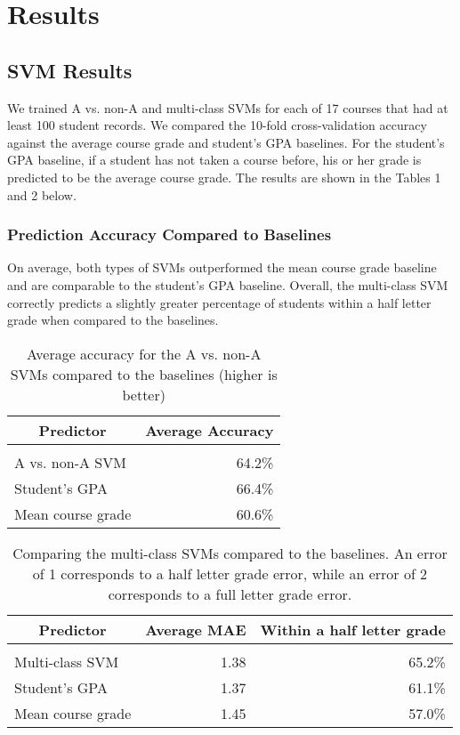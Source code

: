 
\section{Results}

\subsection{SVM Results}

We trained A vs. non-A and multi-class SVMs for each of 17 courses that had at least 100 student records. We compared the 10-fold cross-validation accuracy against the average course grade and student's GPA baselines. For the student's GPA baseline, if a student has not taken a course before, his or her grade is predicted to be the average course grade. The results are shown in the Tables 1 and 2 below.

\subsubsection{Prediction Accuracy Compared to Baselines}

On average, both types of SVMs outperformed the mean course grade baseline and are comparable to the student's GPA baseline. Overall, the multi-class SVM correctly predicts a slightly greater percentage of students within a half letter grade when compared to the baselines.

\begin{table}[htbp]\scriptsize
\begin{center}
\begin{tabular}{lr}
\multicolumn{1}{c}{\bf Predictor}  &\multicolumn{1}{c}{\bf Average Accuracy}
\\ \hline \\
A vs. non-A SVM &64.2\% \\
Student's GPA   &66.4\% \\
Mean course grade &60.6\% \\
\end{tabular}
\caption{Average accuracy for the A vs. non-A SVMs compared to the baselines (higher is better)}
\label{svm-accuracy-table}
\end{center}
\end{table}


\begin{table}[htbp]\scriptsize
\begin{center}
\begin{tabular}{lrr}
\multicolumn{1}{c}{\bf Predictor}  &\multicolumn{1}{c}{\bf Average MAE}  &\multicolumn{1}{c}{\bf Within a half letter grade}
\\ \hline \\
Multi-class SVM &1.38 & 65.2\%\\
Student's GPA   &1.37 & 61.1\%\\
Mean course grade &1.45 &57.0\% \\
\end{tabular}
\caption{Comparing the multi-class SVMs compared to the baselines. An error of 1 corresponds to a half letter grade error, while an error of 2 corresponds to a full letter grade error.}
\label{svm-mae-table}
\end{center}
\end{table}


